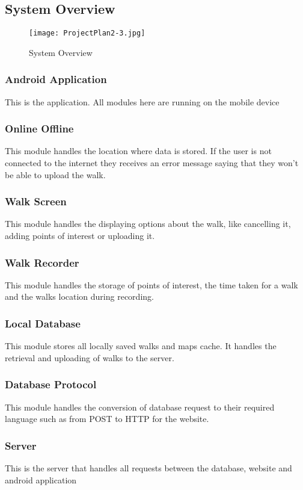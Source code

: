 \documentclass[12pt]{article}
\begin{document}
\subsection{System Overview}
\begin{figure}[htp]
\centering
\texttt{[image: ProjectPlan2-3.jpg]}
\caption{System Overview}
\label{System Overview}
\end{figure}
\subsubsection{Android Application}
This is the application. All modules here are running on the mobile device
\subsubsection{Online Offline}
This module handles the location where data is stored. If the user is not connected to the internet they receives an error message saying that they won't be able to upload the walk.
\subsubsection{Walk Screen}
This module handles the displaying options about the walk, like cancelling it, adding points of interest or uploading it.
\subsubsection{Walk Recorder}
This module handles the storage of points of interest, the time taken for a walk and the walks location during recording.
\subsubsection{Local Database}
\par{This module stores all locally saved walks and maps cache. It handles the retrieval and uploading of walks to the server.}
\subsubsection{Database Protocol}
This module handles the conversion of database request to their required language such as from POST to HTTP for the website.
\subsubsection{Server}
This is the server that handles all requests between the database, website and android application
\end{document}
